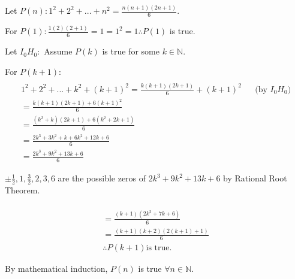 \documentclass[12pt]{article}
\begin{document}
Let $P(n): 1^2 + 2^2 + ... + n^2 = \frac{n(n+1)(2n+1)}{6}.$

For $P(1): \frac{1(2)(2+1)}{6} = 1 = 1^2 = 1 \therefore P(1)$ is true.

Let $I_0H_0:$ Assume $P(k)$ is true for some $k \in \mathbb{N}$.

For $P(k+1)$:
\begin{align*}
\\ 1^2 + 2^2 + ... + k^2 + (k+1)^2 = \frac{k(k+1)(2k+1)}{6} + (k+1)^2 &&\text{(by $I_0H_0$)}
\\ = \frac{k(k+1)(2k+1)+6(k+1)^2}{6} 
\\ = \frac{(k^2+k)(2k+1)+6(k^2+2k+1)}{6} 
\\ = \frac{2k^3+3k^2+k+6k^2+12k+6}{6}
\\ = \frac{2k^3+9k^2+13k+6}{6}
\end{align*}

$ \pm \frac{1}{2},1,\frac{3}{2}, 2,3,6$ are the possible zeros of $2k^3+9k^2+13k+6$ by Rational Root Theorem. 

\begin{align*}
\\ = \frac{(k+1)(2k^2+7k+6)}{6}
\\ = \frac{(k+1)(k+2)(2(k+1)+1)}{6}
\\ \therefore P(k+1) \text{is true.}
\end{align*}

By mathematical induction, $P(n)$ is true $\forall n \in \mathbb{N}$.
\end{document}
